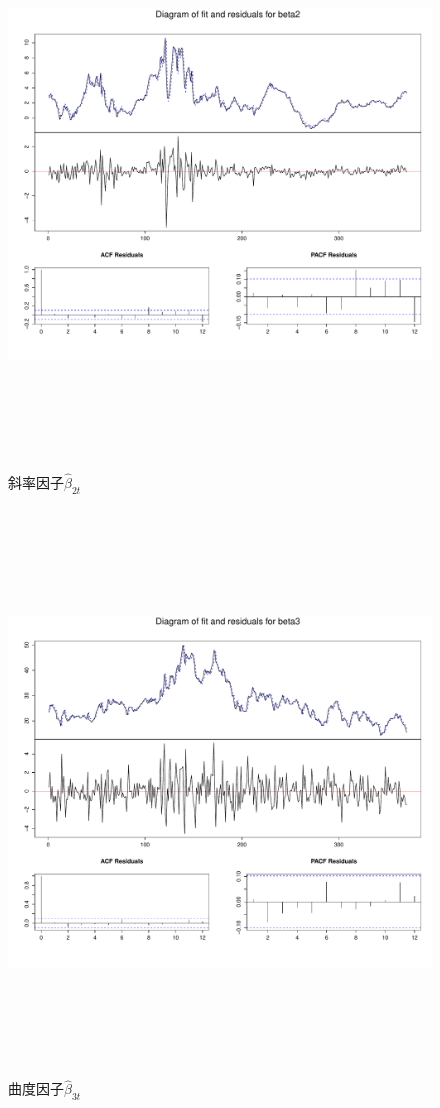        \begin{figure}%
    \includegraphics[width=15cm,height=15cm]{figures/Rplot11}
   \caption{斜率因子$\hat{\beta}_{2t}$}
   \label{Rplot11}
  \end{figure}
       \begin{figure}%
    \includegraphics[width=15cm,height=15cm]{figures/Rplot12}
   \caption{曲度因子$\hat{\beta}_{3t}$}
   \label{Rplot12}
  \end{figure}
